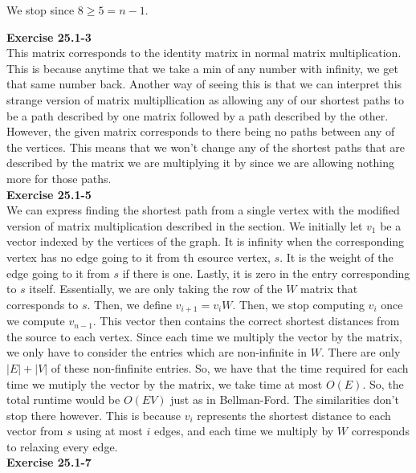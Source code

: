\documentclass{article}
\begin{document}
We stop since $8\ge 5 =n-1$.

\noindent\textbf{Exercise 25.1-3}\\
This matrix corresponds to the identity matrix in normal matrix multiplication. This is because anytime that we take a min of any number with infinity, we get that same number back. Another way of seeing this is that we can interpret this strange version of matrix multipllication as allowing any of our shortest paths to be a path described by one matrix followed by a path described by the other. However, the given matrix corresponds to there being no paths between any of the vertices. This means that we won't change any of the shortest paths that are described by the matrix we are multiplying it by since we are allowing nothing more for those paths.\\


\noindent\textbf{Exercise 25.1-5}\\
We can express finding the shortest path from a single vertex with the modified version of matrix multiplication described in the section. We initially let $v_1$ be a vector indexed by the vertices of the graph. It is infinity when the corresponding vertex has no edge going to it from th esource vertex, $s$. It is the weight of the edge going to it from $s$ if there is one. Lastly, it is zero in the entry corresponding to $s$ itself. Essentially, we are only taking the row of the $W$ matrix that corresponds to $s$. Then, we define $v_{i+1} = v_i W$. Then, we stop computing $v_i$ once we compute $v_{n-1}$. This vector then contains the correct shortest distances from the source to each vertex. Since each time we multiply the vector by the matrix, we only have to consider the entries which are non-infinite in $W$. There are only $|E|+|V|$ of these non-finfinite entries. So, we have that the time required for each time we mutiply the vector by the matrix, we take time at most $O(E)$. So, the total runtime would be $O(EV)$ just as in Bellman-Ford. The similarities don't stop there however. This is because $v_i$ represents the shortest distance to each vector from $s$ using at most $i$ edges, and each time we multiply by $W$ corresponds to relaxing every edge.\\


\noindent\textbf{Exercise 25.1-7}\\
\end{document}
